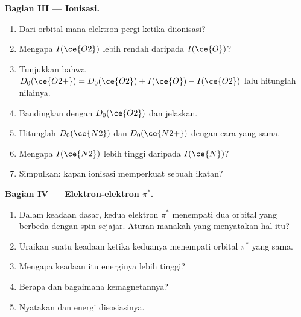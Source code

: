 \begin{problem}
\medskip
\noindent\textbf{Bagian III --- Ionisasi.}
\begin{enumerate}[resume]
  \item Dari orbital mana elektron pergi ketika  diionisasi?
  \item Mengapa $I(\ce{O2})$ lebih rendah daripada $I(\ce{O})$?
  \item Tunjukkan bahwa $D_0(\ce{O2+}) = D_0(\ce{O2}) + I(\ce{O}) - I(\ce{O2})$
        lalu hitunglah nilainya.
  \item Bandingkan dengan $D_0(\ce{O2})$ dan jelaskan.
  \item Hitunglah $D_0(\ce{N2})$ dan $D_0(\ce{N2+})$ dengan cara yang sama.
  \item Mengapa $I(\ce{N2})$ lebih tinggi daripada $I(\ce{N})$?
  \item Simpulkan: kapan ionisasi memperkuat sebuah ikatan?
\end{enumerate}

\medskip
\noindent\textbf{Bagian IV --- Elektron-elektron $\pi^*$.}
\begin{enumerate}[resume]
  \item Dalam keadaan dasar, kedua elektron $\pi^*$ menempati dua orbital
        yang berbeda dengan spin sejajar. Aturan manakah yang menyatakan
        hal itu?
  \item Uraikan suatu keadaan ketika keduanya menempati orbital $\pi^*$
        yang sama.
  \item Mengapa keadaan itu energinya lebih tinggi?
  \item Berapa  dan bagaimana kemagnetannya?
  \item Nyatakan   dan energi disosiasinya.
\end{enumerate}
\end{problem}
